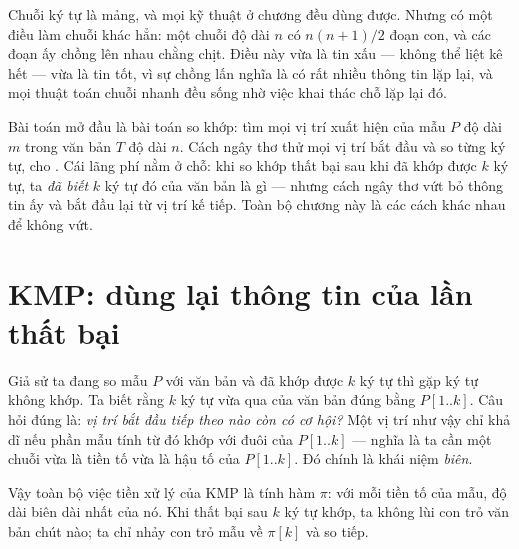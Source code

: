 \documentclass[../../algorithm.tex]{subfiles}
\begin{document}
Chuỗi ký tự là mảng, và mọi kỹ thuật ở chương  đều dùng được. Nhưng có một điều làm chuỗi khác hẳn: một chuỗi độ dài \(n\) có \(n(n+1)/2\) đoạn con, và các đoạn ấy chồng lên nhau chằng chịt. Điều này vừa là tin xấu --- không thể liệt kê hết --- vừa là tin tốt, vì sự chồng lấn nghĩa là có rất nhiều thông tin lặp lại, và mọi thuật toán chuỗi nhanh đều sống nhờ việc khai thác chỗ lặp lại đó.

Bài toán mở đầu là bài toán so khớp: tìm mọi vị trí xuất hiện của mẫu \(P\) độ dài \(m\) trong văn bản \(T\) độ dài \(n\). Cách ngây thơ thử mọi vị trí bắt đầu và so từng ký tự, cho . Cái lãng phí nằm ở chỗ: khi so khớp thất bại sau khi đã khớp được \(k\) ký tự, ta \emph{đã biết} \(k\) ký tự đó của văn bản là gì --- nhưng cách ngây thơ vứt bỏ thông tin ấy và bắt đầu lại từ vị trí kế tiếp. Toàn bộ chương này là các cách khác nhau để không vứt.

\section{KMP: dùng lại thông tin của lần thất bại}

Giả sử ta đang so mẫu \(P\) với văn bản và đã khớp được \(k\) ký tự thì gặp ký tự không khớp. Ta biết rằng \(k\) ký tự vừa qua của văn bản đúng bằng \(P[1..k]\). Câu hỏi đúng là: \emph{vị trí bắt đầu tiếp theo nào còn có cơ hội?} Một vị trí như vậy chỉ khả dĩ nếu phần mẫu tính từ đó khớp với đuôi của \(P[1..k]\) --- nghĩa là ta cần một chuỗi vừa là tiền tố vừa là hậu tố của \(P[1..k]\). Đó chính là khái niệm \emph{biên}.

Vậy toàn bộ việc tiền xử lý của KMP là tính hàm \(\pi\): với mỗi tiền tố của mẫu, độ dài biên dài nhất của nó. Khi thất bại sau \(k\) ký tự khớp, ta không lùi con trỏ văn bản chút nào; ta chỉ nhảy con trỏ mẫu về \(\pi[k]\) và so tiếp.
\end{document}
